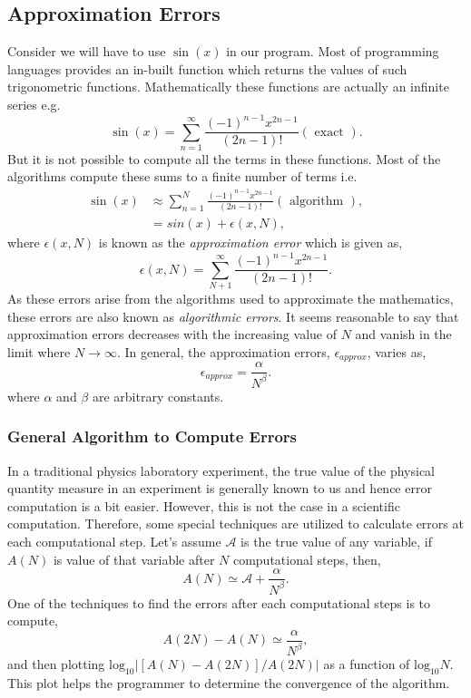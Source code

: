 \documentclass[a4,12pt]{article}
\numberwithin{equation}{subsection}
\begin{document}
\subsection{Approximation Errors}
Consider we will have to use $\sin(x)$ in our program. Most of programming languages provides an in-built function which returns the values of such trigonometric functions. Mathematically these functions are actually an infinite series e.g. 
$$\sin(x) = \sum^{\infty}_{n=1} \frac{(-1)^{n-1}x^{2n-1}}{(2n-1)!} (\text{ exact }).$$
But it is not possible to compute all the terms in these functions. Most of the algorithms compute these sums to a finite number of terms i.e.
\begin{align}
\sin(x) &\approx \sum^{N}_{n=1} \frac{(-1)^{n-1}x^{2n-1}}{(2n-1)!} (\text{ algorithm }), && \\
        &= sin(x)+\epsilon(x,N), && 
 \end{align}  
 where $\epsilon(x,N)$ is known as the \textit{approximation error} which is given as,
$$\epsilon(x,N) = \sum^{\infty}_{N+1} \frac{(-1)^{n-1}x^{2n-1}}{(2n-1)!} .$$
As these errors arise from the algorithms used to approximate the mathematics, these errors are also known as \textit{algorithmic errors}. It seems reasonable to say that approximation errors decreases with the increasing value of $N$ and vanish in the limit where $N \to \infty$. In general, the approximation errors, $\epsilon_{approx}$, varies as, 
$$\epsilon_{approx} = \frac{\alpha}{N^{\beta}}.$$
where $\alpha$ and $\beta$ are arbitrary constants.

\subsubsection{General Algorithm to Compute Errors}
In a traditional physics laboratory experiment, the true value of the physical quantity measure in an experiment is generally known to us and hence error computation is a bit easier. However, this is not the case in a scientific computation. Therefore, some special techniques are utilized to calculate errors at each computational step. Let's assume $\mathcal{A}$ is the true value of any variable, if $A(N)$ is value of that variable after $N$ computational steps, then,
$$A(N) \simeq \mathcal{A} + \frac{\alpha}{N^{\beta}}.$$
One of the techniques to find the errors after each computational steps is to compute,
$$A(2N)-A(N) \simeq \frac{\alpha}{N^{\beta}},$$
and then plotting $\text{log}_{10}\left|[A(N)-A(2N)]/A(2N) \right|$ as a function of $\text{log}_{10}N$. This plot helps the programmer to determine the convergence of the algorithm.
\end{document}
